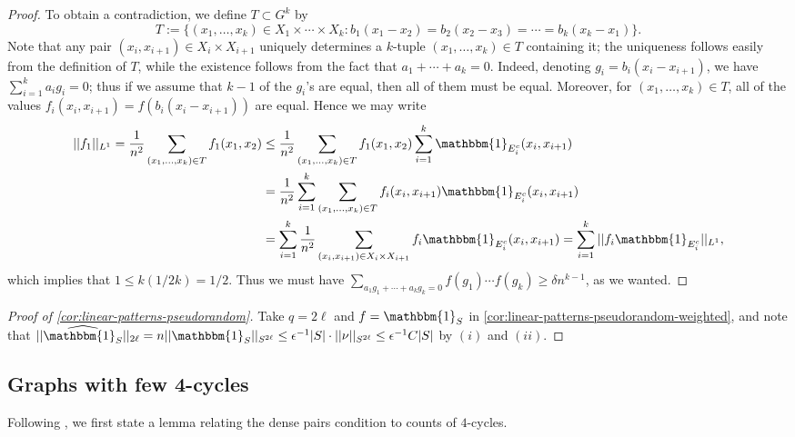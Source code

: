 \documentclass[reqno,11pt]{amsart}
\theoremstyle{definition}
\theoremstyle{remark}
\numberwithin{equation}{section}
\newcommand{\one}{\mathbbm{1}}
\renewcommand{\hat}{\widehat}
\begin{document}
\begin{proof}
To obtain a contradiction, we define $T \subset G^k$ by 
\[
    T := \{(x_1, \ldots, x_k) \in X_1 \times \cdots \times X_k : b_1(x_1 - x_2) = b_2(x_2 - x_3) = \cdots = b_k(x_k - x_1)\}.
\]
Note that any pair $(x_i, x_{i+1}) \in X_i \times X_{i+1}$ uniquely determines a $k$-tuple $(x_1, \ldots, x_k) \in T$ containing it; the uniqueness follows easily from the definition of $T$, while the existence follows from the fact that $a_1 + \cdots + a_k = 0$. Indeed, denoting $g_i = b_i(x_i - x_{i+1})$, we have $\sum_{i=1}^k a_i g_i = 0$; thus if we assume that $k-1$ of the $g_i$'s are equal, then all of them must be equal. Moreover, for $(x_1, \ldots, x_k) \in T$, all of the values $f_{i}(x_i, x_{i+1}) = f(b_i(x_i - x_{i+1}))$ are equal. Hence we may write
\[
\begin{aligned}
    ||f_1||_{L^1} 
    =
    \frac{1}{n^2} \sum_{(x_1, \ldots, x_k) \in T} f_{1}(x_1, x_2)
    &\le
    \frac{1}{n^2} 
    \sum_{(x_1, \ldots, x_k) \in T} f_{1}(x_1, x_2) \sum_{i=1}^k \one_{E_{i}^c}(x_i, x_{i+1})
    \\
    &=
    \frac{1}{n^2} 
    \sum_{i=1}^k \sum_{(x_1, \ldots, x_k) \in T} f_{i}(x_i, x_{i+1})  \one_{E_{i}^c}(x_i, x_{i+1})
    \\
    &=
    \sum_{i=1}^k\frac{1}{n^2} 
    \sum_{(x_i, x_{i+1}) \in X_i \times X_{i+1}} f_{i}\one_{E_{i}^c}  (x_i, x_{i+1})
    =
    \sum_{i=1}^k ||f_i \one_{E_i^c}||_{L^1},
\end{aligned}
\]
which implies that $1 \le k (1/2k) = 1/2$. Thus we must have $\sum_{a_1g_1 + \cdots + a_k g_k = 0} f(g_1) \cdots f(g_k) \ge \delta n^{k-1}$, as we wanted.
\end{proof}


\begin{proof}[Proof of \cref{cor:linear-patterns-pseudorandom}]
Take $q = 2\ell$ and $f = \one_S$ in \cref{cor:linear-patterns-pseudorandom-weighted}, and note that $||\hat{\one_S}||_{2\ell} = n||\one_S||_{S^{2\ell}} \le \epsilon^{-1}|S| \cdot ||\nu||_{S^{2\ell}} \le \epsilon^{-1} C |S|$ by $(i)$ and $(ii)$.
\end{proof}



\subsection{Graphs with few 4-cycles} 

Following \cite{conlon2021regularity}, we first state a lemma relating the dense pairs condition to counts of $4$-cycles.
\end{document}
